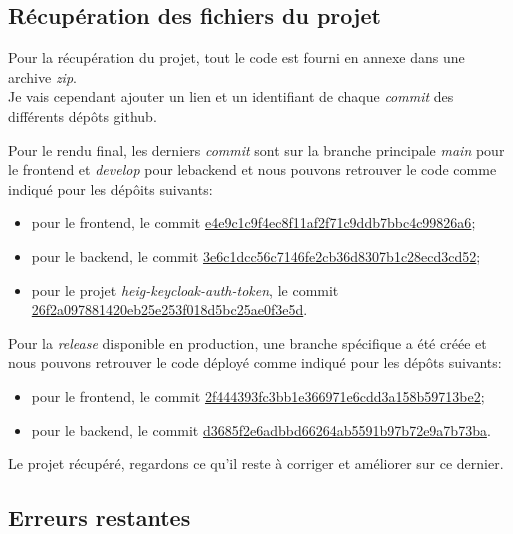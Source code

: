 \documentclass[
    iai, %
    il, %
]{heig-tb}
\begin{document}
\subsection{Récupération des fichiers du projet}
Pour la récupération du projet, tout le code est fourni en annexe dans une archive \emph{zip}. \\

Je vais cependant ajouter un lien et un identifiant de chaque \emph{commit} des différents dépôts \Gls{github}.

Pour le rendu final, les derniers \emph{commit} sont sur la branche principale \emph{main} pour le \Gls{frontend} et \emph{develop} pour le\Gls{backend} et nous pouvons retrouver le code comme indiqué pour les dépôits suivants:
\begin{itemize}
    \item pour le \Gls{frontend}, le commit \href{https://github.com/heig-fablab/fablab-manager-frontend/commit/e4e9c1c9f4ec8f11af2f71c9ddb7bbc4c99826a6}{e4e9c1c9f4ec8f11af2f71c9ddb7bbc4c99826a6};
    \item pour le \Gls{backend}, le commit \href{https://github.com/heig-fablab/fablab-manager/commit/3e6c1dcc56c7146fe2cb36d8307b1c28ecd3cd52}{3e6c1dcc56c7146fe2cb36d8307b1c28ecd3cd52};
    \item pour le projet \emph{heig-keycloak-auth-token}, le commit \href{https://github.com/heig-fablab/heig-keycloak-auth-token/commit/26f2a097881420eb25e253f018d5bc25ae0f3e5d}{26f2a097881420eb25e253f018d5bc25ae0f3e5d}.
\end{itemize}

Pour la \emph{release} disponible en production, une branche spécifique a été créée et nous pouvons retrouver le code déployé comme indiqué pour les dépôts suivants:
\begin{itemize}
    \item pour le \Gls{frontend}, le commit \href{https://github.com/heig-fablab/fablab-manager-frontend/commit/2f444393fc3bb1e366971e6cdd3a158b59713be2}{2f444393fc3bb1e366971e6cdd3a158b59713be2};
    \item pour le \Gls{backend}, le commit \href{https://github.com/heig-fablab/fablab-manager/commit/d3685f2e6adbbd66264ab5591b97b72e9a7b73ba}{d3685f2e6adbbd66264ab5591b97b72e9a7b73ba}.
\end{itemize}

Le projet récupéré, regardons ce qu'il reste à corriger et améliorer sur ce dernier.

\subsection{Erreurs restantes}
\end{document}
